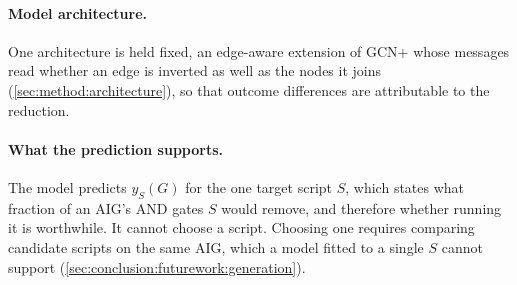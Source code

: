 \paragraph{Model architecture.}
\label{sec:intro:scope:architecture}
One architecture is held fixed, an edge-aware extension of GCN+ \citep{luo2024gnnplus} whose
messages read whether an edge is inverted as well as the nodes it joins
(\ref{sec:method:architecture}), so that outcome differences are attributable to the
reduction.

\paragraph{What the prediction supports.}
\label{sec:intro:scope:prediction}
The model predicts $y_S(G)$ for the one target script $S$, which states what fraction of an
AIG's AND gates $S$ would remove, and therefore whether running it is worthwhile. It
cannot choose a script. Choosing one requires comparing candidate scripts on the same
AIG, which a model fitted to a single $S$ cannot support
(\ref{sec:conclusion:futurework:generation}).

